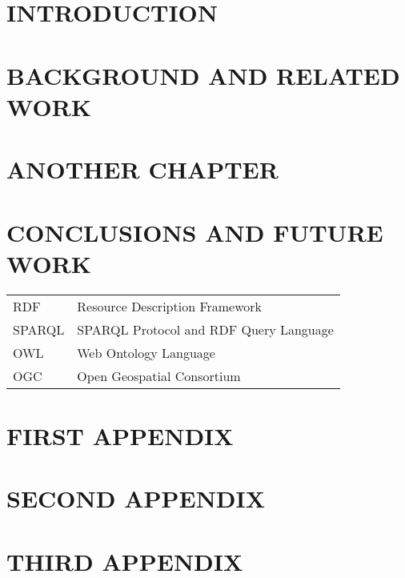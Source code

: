 \documentclass[inscr,ack,preface]{diphdthesis}
\begin{document}
\frontmatter


\mainmatter

\chapter{INTRODUCTION}
\chapter{BACKGROUND AND RELATED WORK}
\chapter{ANOTHER CHAPTER}
\chapter{CONCLUSIONS AND FUTURE WORK}

\backmatter

\abbreviations
\begin{center}
	\renewcommand{\arraystretch}{1.5}
	\begin{longtable}{ l @{\qquad} l }
	\toprule
	RDF    & Resource Description Framework \\
	SPARQL & SPARQL Protocol and RDF Query Language \\
	OWL    & Web Ontology Language \\
	OGC    & Open Geospatial Consortium \\
	\bottomrule
	\end{longtable}
\end{center}

\begin{appendix}
\appendixstartedtrue

{}

\chapter{FIRST APPENDIX}
\chapter{SECOND APPENDIX}
\chapter{THIRD APPENDIX}
\end{appendix}



\end{document}
